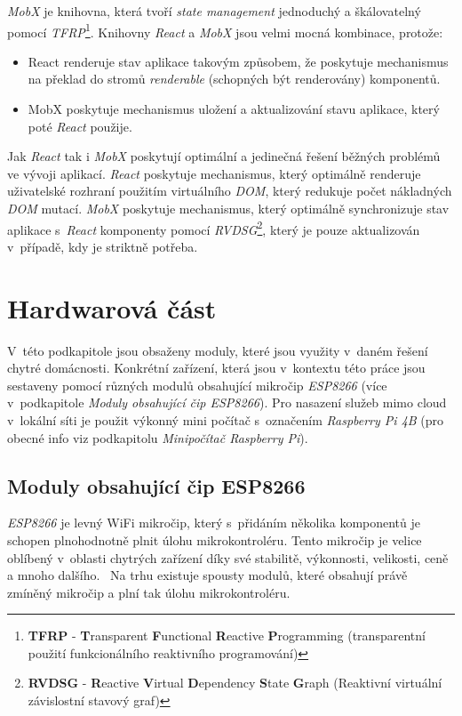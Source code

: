 \emph{MobX} je knihovna, která tvoří \emph{state management} jednoduchý a škálovatelný pomocí \emph{TFRP}\footnote{\textbf{TFRP} - \textbf{T}ransparent \textbf{F}unctional \textbf{R}eactive \textbf{P}rogramming (transparentní použití funkcionálního reaktivního programování)}.
Knihovny \emph{React} a \emph{MobX} jsou velmi mocná kombinace, protože:
\begin{itemize}
  \item React renderuje stav aplikace takovým způsobem, že poskytuje mechanismus na překlad do stromů \emph{renderable} (schopných být renderovány) komponentů.
  \item MobX poskytuje mechanismus uložení a aktualizování stavu aplikace, který poté \emph{React} použije.
\end{itemize}

Jak \emph{React} tak i \emph{MobX} poskytují optimální a jedinečná řešení běžných problémů ve vývoji aplikací.
\emph{React} poskytuje mechanismus, který optimálně renderuje uživatelské rozhraní použitím virtuálního \emph{DOM}, který redukuje počet nákladných \emph{DOM} mutací.
\emph{MobX} poskytuje mechanismus, který optimálně synchronizuje stav aplikace s~\emph{React} komponenty pomocí
\emph{RVDSG}\footnote{\textbf{RVDSG} - \textbf{R}eactive \textbf{V}irtual \textbf{D}ependency \textbf{S}tate \textbf{G}raph (Reaktivní virtuální závislostní stavový graf)}, který je pouze aktualizován v~případě, kdy je striktně potřeba.~\cite{mobx:info}

\newpage
\section{Hardwarová část}
\label{pouzite:hw}
V~této podkapitole jsou obsaženy moduly, které jsou využity v~daném řešení chytré domácnosti.
Konkrétní zařízení, která jsou v~kontextu této práce jsou sestaveny pomocí různých modulů obsahující mikročip \emph{ESP8266} (více v~podkapitole \emph{Moduly obsahující čip ESP8266}).
Pro nasazení služeb mimo cloud v~lokální síti je použit výkonný mini počítač s~označením \emph{Raspberry Pi 4B} (pro obecné info viz podkapitolu \emph{Minipočítač Raspberry Pi}).

\subsection*{Moduly obsahující čip ESP8266}
\label{terminy:esp8266}

\emph{ESP8266} je levný WiFi mikročip, který s~přidáním několika komponentů je schopen plnohodnotně plnit úlohu mikrokontroléru.
Tento mikročip je velice oblíbený v~oblasti chytrých zařízení díky své stabilitě, výkonnosti, velikosti, ceně a mnoho dalšího.~\cite{wiki:esp}
Na trhu existuje spousty modulů, které obsahují právě zmíněný mikročip a plní tak úlohu mikrokontroléru.

